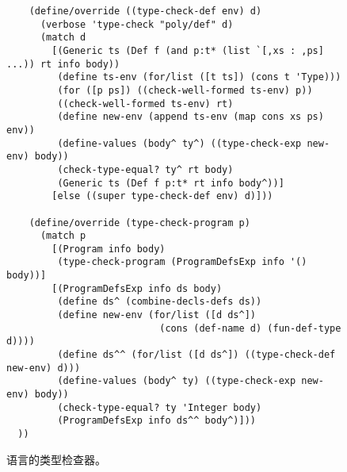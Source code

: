 \documentclass[11pt]{book}
\begin{document}
\begin{figure}[tbp]
\begin{lstlisting}
    (define/override ((type-check-def env) d)
      (verbose 'type-check "poly/def" d)
      (match d
        [(Generic ts (Def f (and p:t* (list `[,xs : ,ps] ...)) rt info body))
         (define ts-env (for/list ([t ts]) (cons t 'Type)))
         (for ([p ps]) ((check-well-formed ts-env) p))
         ((check-well-formed ts-env) rt)
         (define new-env (append ts-env (map cons xs ps) env))
         (define-values (body^ ty^) ((type-check-exp new-env) body))
         (check-type-equal? ty^ rt body)
         (Generic ts (Def f p:t* rt info body^))]
        [else ((super type-check-def env) d)]))

    (define/override (type-check-program p)
      (match p
        [(Program info body)
         (type-check-program (ProgramDefsExp info '() body))]
        [(ProgramDefsExp info ds body)
         (define ds^ (combine-decls-defs ds))
         (define new-env (for/list ([d ds^])
                           (cons (def-name d) (fun-def-type d))))
         (define ds^^ (for/list ([d ds^]) ((type-check-def new-env) d)))
         (define-values (body^ ty) ((type-check-exp new-env) body))
         (check-type-equal? ty 'Integer body)
         (ProgramDefsExp info ds^^ body^)]))
  ))
\end{lstlisting}
\caption{ \LangPoly{} 语言的类型检查器。}
\label{fig:type-check-Rvar0}
\end{figure}
\end{document}
